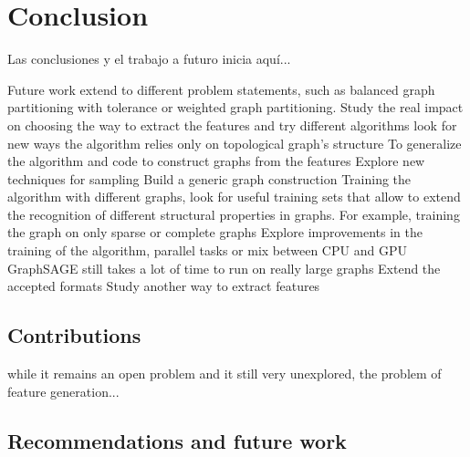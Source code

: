 
\chapter{Conclusion}
\label{Conclusion}
Las conclusiones y el trabajo a futuro inicia aqu\'i...

Future work
extend to different problem statements, such as balanced graph partitioning with tolerance or weighted graph partitioning.
Study the real impact on choosing the way to extract the features and try different algorithms
look for new ways the algorithm relies only on topological graph's structure
To generalize the algorithm and code to construct graphs from the features
Explore new techniques for sampling
Build a generic graph construction
Training the algorithm with different graphs, look for useful training sets that allow to extend the recognition of different structural properties in graphs. For example, training the graph on only sparse or complete graphs
Explore improvements in the training of the algorithm, parallel tasks or mix between CPU and GPU
GraphSAGE still takes a lot of time to run on really large graphs
Extend the accepted formats 
Study another way to extract features
\section{Contributions}
while it remains an open problem and it still very unexplored, the problem of feature generation...
\section{Recommendations and future work}

\clearpage